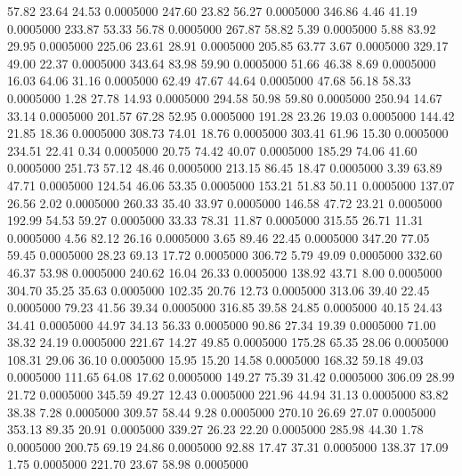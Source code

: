   57.82   23.64   24.53   0.0005000
 247.60   23.82   56.27   0.0005000
 346.86    4.46   41.19   0.0005000
 233.87   53.33   56.78   0.0005000
 267.87   58.82    5.39   0.0005000
   5.88   83.92   29.95   0.0005000
 225.06   23.61   28.91   0.0005000
 205.85   63.77    3.67   0.0005000
 329.17   49.00   22.37   0.0005000
 343.64   83.98   59.90   0.0005000
  51.66   46.38    8.69   0.0005000
  16.03   64.06   31.16   0.0005000
  62.49   47.67   44.64   0.0005000
  47.68   56.18   58.33   0.0005000
   1.28   27.78   14.93   0.0005000
 294.58   50.98   59.80   0.0005000
 250.94   14.67   33.14   0.0005000
 201.57   67.28   52.95   0.0005000
 191.28   23.26   19.03   0.0005000
 144.42   21.85   18.36   0.0005000
 308.73   74.01   18.76   0.0005000
 303.41   61.96   15.30   0.0005000
 234.51   22.41    0.34   0.0005000
  20.75   74.42   40.07   0.0005000
 185.29   74.06   41.60   0.0005000
 251.73   57.12   48.46   0.0005000
 213.15   86.45   18.47   0.0005000
   3.39   63.89   47.71   0.0005000
 124.54   46.06   53.35   0.0005000
 153.21   51.83   50.11   0.0005000
 137.07   26.56    2.02   0.0005000
 260.33   35.40   33.97   0.0005000
 146.58   47.72   23.21   0.0005000
 192.99   54.53   59.27   0.0005000
  33.33   78.31   11.87   0.0005000
 315.55   26.71   11.31   0.0005000
   4.56   82.12   26.16   0.0005000
   3.65   89.46   22.45   0.0005000
 347.20   77.05   59.45   0.0005000
  28.23   69.13   17.72   0.0005000
 306.72    5.79   49.09   0.0005000
 332.60   46.37   53.98   0.0005000
 240.62   16.04   26.33   0.0005000
 138.92   43.71    8.00   0.0005000
 304.70   35.25   35.63   0.0005000
 102.35   20.76   12.73   0.0005000
 313.06   39.40   22.45   0.0005000
  79.23   41.56   39.34   0.0005000
 316.85   39.58   24.85   0.0005000
  40.15   24.43   34.41   0.0005000
  44.97   34.13   56.33   0.0005000
  90.86   27.34   19.39   0.0005000
  71.00   38.32   24.19   0.0005000
 221.67   14.27   49.85   0.0005000
 175.28   65.35   28.06   0.0005000
 108.31   29.06   36.10   0.0005000
  15.95   15.20   14.58   0.0005000
 168.32   59.18   49.03   0.0005000
 111.65   64.08   17.62   0.0005000
 149.27   75.39   31.42   0.0005000
 306.09   28.99   21.72   0.0005000
 345.59   49.27   12.43   0.0005000
 221.96   44.94   31.13   0.0005000
  83.82   38.38    7.28   0.0005000
 309.57   58.44    9.28   0.0005000
 270.10   26.69   27.07   0.0005000
 353.13   89.35   20.91   0.0005000
 339.27   26.23   22.20   0.0005000
 285.98   44.30    1.78   0.0005000
 200.75   69.19   24.86   0.0005000
  92.88   17.47   37.31   0.0005000
 138.37   17.09    1.75   0.0005000
 221.70   23.67   58.98   0.0005000
